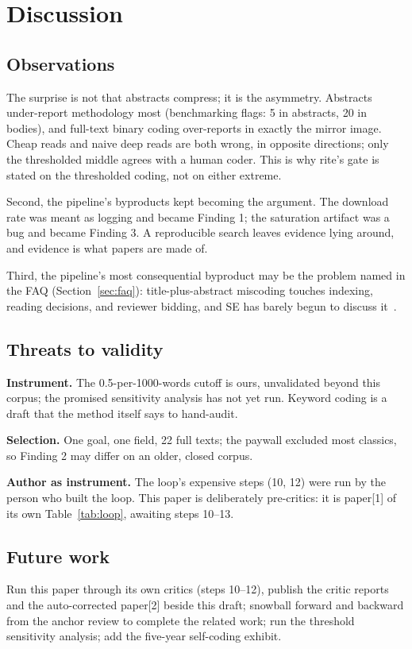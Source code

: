 \section{Discussion}\label{sec:disc}

\subsection{Observations}

The surprise is not that abstracts compress; it is the asymmetry.
Abstracts under-report methodology most (benchmarking flags: 5 in
abstracts, 20 in bodies), and full-text binary coding over-reports in
exactly the mirror image.
Cheap reads and naive deep reads are both wrong, in opposite
directions; only the thresholded middle agrees with a human coder.
This is why rite's gate is stated on the thresholded coding, not on
either extreme.

Second, the pipeline's byproducts kept becoming the argument.
The download rate was meant as logging and became Finding 1; the
saturation artifact was a bug and became Finding 3.
A reproducible search leaves evidence lying around, and evidence is
what papers are made of.

Third, the pipeline's most consequential byproduct may be the problem
named in the FAQ (Section~\ref{sec:faq}): title-plus-abstract
miscoding touches indexing, reading decisions, and reviewer bidding,
and SE has barely begun to discuss it~\cite{brereton07}.

\subsection{Threats to validity}

\textbf{Instrument.}
The 0.5-per-1000-words cutoff is ours, unvalidated beyond this corpus;
the promised sensitivity analysis has not yet run.
Keyword coding is a draft that the method itself says to hand-audit.

\textbf{Selection.}
One goal, one field, 22 full texts; the paywall excluded most
classics, so Finding 2 may differ on an older, closed corpus.

\textbf{Author as instrument.}
The loop's expensive steps (10, 12) were run by the person who built
the loop.
This paper is deliberately pre-critics: it is paper[1] of its own
Table~\ref{tab:loop}, awaiting steps 10--13.

\subsection{Future work}

Run this paper through its own critics (steps 10--12), publish the
critic reports and the auto-corrected paper[2] beside this draft;
snowball forward and backward from the anchor review to complete the
related work; run the threshold sensitivity analysis; add the
five-year self-coding exhibit.
